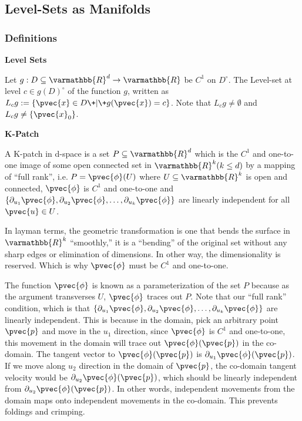 \documentclass[11 pt, twoside]{article}
\begin{document}
\subsection{Level-Sets as Manifolds}

\subsubsection{Definitions}

\textbf{Level Sets}

Let $g: D \subseteq \varmathbb{R}^d \to \varmathbb{R}$ be
$C^1$ on $D^\circ$. The Level-set at level $c \in g(D)^\circ$ of the function $g$, written as
$L_c g := \{\pvec{x} \in D \+|\+ g(\pvec{x}) = c\}$. Note that $L_c g \neq
\emptyset$ and $L_c g \neq \{\pvec{x}_0\}$.

\textbf{K-Patch}

A K-patch in d-space is a set $P \subseteq \varmathbb{R}^d$ which is the $C^1$
and one-to-one image of some open connected set in $\varmathbb{R}^k (k \leq d)$
by a mapping of ``full rank'', i.e. $P = \pvec{\phi}(U)$ where $U \subseteq
\varmathbb{R}^k$ is open and connected, $\pvec{\phi}$ is $C^1$ and one-to-one and
$\{\partial_{u_1} \pvec{\phi}, \partial_{u_2} \pvec{\phi}, \dots, \partial_{u_k}
\pvec{\phi}\}$ are linearly independent for all $\pvec{u} \in U$.

In layman terms, the geometric transformation is one that bends the surface in
$\varmathbb{R}^k$ ``smoothly,'' it is a ``bending'' of the original set without
any sharp edges or elimination of dimensions. In other way, the dimensionality
is reserved. Which is why $\pvec{\phi}$ must be $C^1$ and one-to-one.

The function $\pvec{\phi}$ is known as a parameterization of the set $P$ because
as the argument transverses $U$, $\pvec{\phi}$ traces out $P$. Note that our
``full rank'' condition, which is that $\{\partial_{u_1} \pvec{\phi},
\partial_{u_2} \pvec{\phi}, \dots, \partial_{u_k} \pvec{\phi}\}$ are linearly
independent. This is because in the domain, pick an arbitrary point $\pvec{p}$
and move in the $u_1$ direction, since $\pvec{\phi}$ is $C^1$ and one-to-one,
this movement in the domain will trace out $\pvec{\phi}(\pvec{p})$ in the
co-domain. The tangent vector to $\pvec{\phi}(\pvec{p})$ is $\partial_{u_1}
\pvec{\phi}(\pvec{p})$. If we move along $u_2$ direction in the domain of
$\pvec{p}$, the co-domain tangent velocity would be
$\partial_{u_2}\pvec{\phi}(\pvec{p})$, which should be linearly independent from
$\partial_{u_2}\pvec{\phi}(\pvec{p})$. In other words, independent movements from
the domain maps onto independent movements in the co-domain. This prevents
foldings and crimping.
\end{document}

